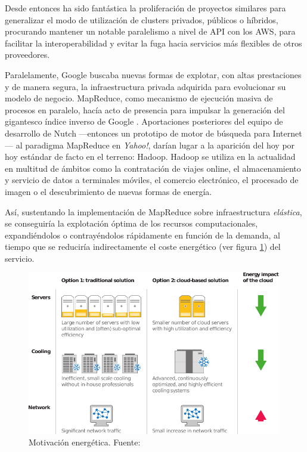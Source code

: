 Desde entonces ha sido fant\'astica la proliferaci\'on de proyectos similares para generalizar el modo de utilizaci\'on de clusters privados, p\'ublicos o h\'ibridos, procurando mantener un notable paralelismo a nivel de API con los AWS, para facilitar la interoperabilidad y evitar la fuga hacia servicios m\'as flexibles de otros proveedores.\newline

Paralelamente, Google buscaba nuevas formas de explotar, con altas pres\-ta\-cio\-nes y de manera segura, la infraestructura privada adquirida para evolucionar su modelo de negocio. MapReduce, como mecanismo de ejecuci\'on masiva de procesos en paralelo, hac\'ia acto de presencia para impulsar la ge\-ne\-ra\-ci\'on del gigantesco \'indice inverso de Google \cite{googlemapreduce}. Aportaciones pos\-te\-rio\-res del equipo de desarrollo de Nutch ---entonces un prototipo de motor de b\'usqueda para Internet--- al paradigma MapReduce en \emph{Yahoo!}, dar\'ian lugar a la aparici\'on del hoy por hoy est\'andar de facto en el terreno: Hadoop. Hadoop se utiliza en la actualidad en multitud de \'ambitos como la con\-tra\-ta\-ci\'on de viajes online, el almacenamiento y servicio de datos a terminales m\'oviles, el comercio electr\'onico, el procesado de imagen o el descubrimiento de nuevas formas de energ\'ia.\newline

As\'i, sustentando la implementaci\'on de MapReduce sobre infraestructura \emph{el\'astica}, se conseguir\'ia la explotaci\'on \'optima de los recursos computacionales, expandi\'endolos o contray\'endolos r\'apidamente en funci\'on de la demanda, al tiempo que se reducir\'ia indirectamente el coste energ\'etico (ver figura \ref{fig:energysavings}) del servicio.

\begin{figure}[tbp]
\begin{center}
\includegraphics[width=0.99\textwidth]{imagenes/002.pdf}
 \caption{Motivaci\'on energ\'etica. Fuente: \cite{googleapps}}
\label{fig:energysavings}
\end{center}
\end{figure}



